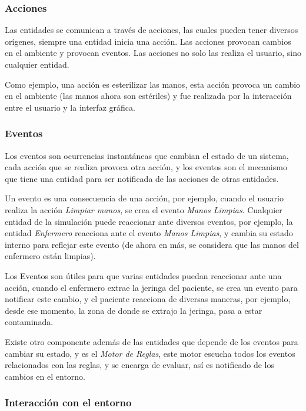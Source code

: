 \subsubsection{Acciones}

Las entidades se comunican a través de acciones, las cuales pueden tener
diversos orígenes, siempre una entidad inicia una acción. Las acciones provocan
cambios en el ambiente y provocan eventos. Las acciones no solo las
realiza el usuario, sino cualquier entidad.

Como ejemplo, una acción es esterilizar las manos, esta acción provoca un
cambio en el ambiente (las manos ahora son estériles) y fue realizada por la
interacción entre el usuario y la interfaz gráfica.

\subsubsection{Eventos}

Los eventos son ocurrencias instantáneas que cambian el estado de un
sistema\cite{banks2000dm}, cada acción que se realiza provoca otra acción, y los
eventos son el mecanismo que tiene una entidad para ser notificada de las
acciones de otras entidades.

Un evento es una consecuencia de una acción, por ejemplo, cuando el usuario 
realiza la acción \emph{Limpiar manos}, se crea el evento \emph{Manos Limpias}. 
Cualquier entidad de la simulación puede reaccionar ante diversos eventos, 
por ejemplo, la entidad \emph{Enfermero} reacciona ante el evento \emph{Manos
Limpias}, y cambia su estado interno para reflejar este evento (de ahora en 
más, se considera que las manos del enfermero están limpias).

Los Eventos son útiles para que varias entidades puedan reaccionar ante
una acción, cuando el enfermero extrae la jeringa del paciente, se crea un
evento para notificar este cambio, y el paciente reacciona de diversas maneras,
por ejemplo, desde ese momento, la zona de donde se extrajo la jeringa, pasa a 
estar contaminada. 

Existe otro componente además de las entidades que depende de los eventos 
para cambiar su estado, y es el \emph{Motor de Reglas}, este motor escucha
todos los eventos relacionados con las reglas, y se encarga de evaluar, así
es notificado de los cambios en el entorno.

\subsubsection{Interacción con el entorno}

